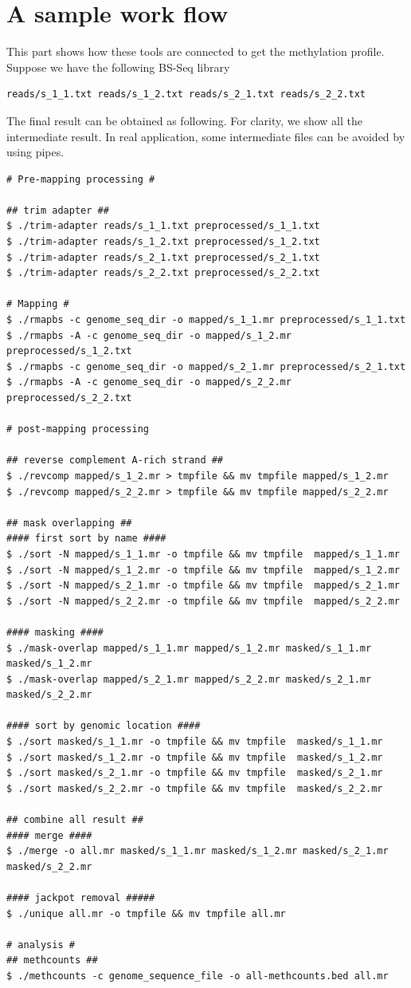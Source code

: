 \documentclass{article}
\begin{document}
\section{A sample work flow}
This part shows how these tools are connected to get the methylation
profile. Suppose we have the following BS-Seq library
\begin{verbatim}
reads/s_1_1.txt reads/s_1_2.txt reads/s_2_1.txt reads/s_2_2.txt
\end{verbatim}

The final result can be obtained as following. For clarity, we show
all the intermediate result. In real application, some intermediate
files can be avoided by using pipes.

\begin{verbatim}
# Pre-mapping processing #

## trim adapter ##
$ ./trim-adapter reads/s_1_1.txt preprocessed/s_1_1.txt
$ ./trim-adapter reads/s_1_2.txt preprocessed/s_1_2.txt
$ ./trim-adapter reads/s_2_1.txt preprocessed/s_2_1.txt
$ ./trim-adapter reads/s_2_2.txt preprocessed/s_2_2.txt

# Mapping #
$ ./rmapbs -c genome_seq_dir -o mapped/s_1_1.mr preprocessed/s_1_1.txt
$ ./rmapbs -A -c genome_seq_dir -o mapped/s_1_2.mr preprocessed/s_1_2.txt
$ ./rmapbs -c genome_seq_dir -o mapped/s_2_1.mr preprocessed/s_2_1.txt
$ ./rmapbs -A -c genome_seq_dir -o mapped/s_2_2.mr preprocessed/s_2_2.txt

# post-mapping processing

## reverse complement A-rich strand ##
$ ./revcomp mapped/s_1_2.mr > tmpfile && mv tmpfile mapped/s_1_2.mr
$ ./revcomp mapped/s_2_2.mr > tmpfile && mv tmpfile mapped/s_2_2.mr

## mask overlapping ##
#### first sort by name ####
$ ./sort -N mapped/s_1_1.mr -o tmpfile && mv tmpfile  mapped/s_1_1.mr 
$ ./sort -N mapped/s_1_2.mr -o tmpfile && mv tmpfile  mapped/s_1_2.mr 
$ ./sort -N mapped/s_2_1.mr -o tmpfile && mv tmpfile  mapped/s_2_1.mr 
$ ./sort -N mapped/s_2_2.mr -o tmpfile && mv tmpfile  mapped/s_2_2.mr 

#### masking ####
$ ./mask-overlap mapped/s_1_1.mr mapped/s_1_2.mr masked/s_1_1.mr masked/s_1_2.mr
$ ./mask-overlap mapped/s_2_1.mr mapped/s_2_2.mr masked/s_2_1.mr masked/s_2_2.mr

#### sort by genomic location ####
$ ./sort masked/s_1_1.mr -o tmpfile && mv tmpfile  masked/s_1_1.mr 
$ ./sort masked/s_1_2.mr -o tmpfile && mv tmpfile  masked/s_1_2.mr 
$ ./sort masked/s_2_1.mr -o tmpfile && mv tmpfile  masked/s_2_1.mr 
$ ./sort masked/s_2_2.mr -o tmpfile && mv tmpfile  masked/s_2_2.mr 

## combine all result ##
#### merge ####
$ ./merge -o all.mr masked/s_1_1.mr masked/s_1_2.mr masked/s_2_1.mr masked/s_2_2.mr 

#### jackpot removal #####
$ ./unique all.mr -o tmpfile && mv tmpfile all.mr

# analysis #
## methcounts ##
$ ./methcounts -c genome_sequence_file -o all-methcounts.bed all.mr 
\end{verbatim}
\end{document}

